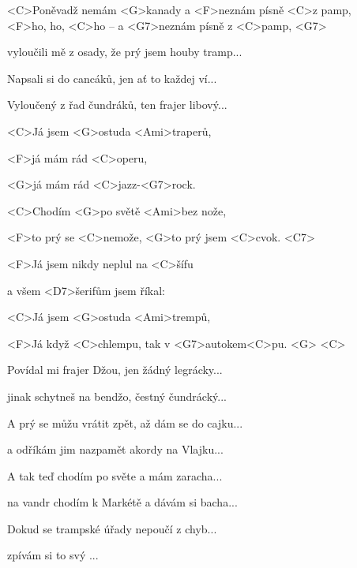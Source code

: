 

\zs
<C>Poněvadž nemám <G>kanady a <F>neznám písně <C>z pamp,
\\
<F>ho, ho, <C>ho -- a <G7>neznám písně z <C>pamp, 
<G7>

vyloučili mě z osady, že prý jsem houby tramp...

Napsali si do cancáků, jen ať to každej ví...

Vyloučený z řad čundráků, ten frajer libový...
\ks

\zr
<C>Já jsem <G>ostuda <Ami>traperů,

<F>já mám rád <C>operu,

<G>já mám rád <C>jazz-<G7>rock.

<C>Chodím <G>po světě <Ami>bez nože,

<F>to prý se <C>nemože, <G>to prý jsem <C>cvok. <C7>

<F>Já jsem nikdy neplul na <C>šífu

a všem <D7>šerifům jsem říkal: 

<C>Já jsem <G>ostuda <Ami>trempů,

<F>Já když <C>chlempu, tak v <G7>autokem<C>pu. <G> 
<C>
\kr

\zs
Povídal mi frajer Džou, jen žádný legrácky...

jinak schytneš na bendžo, čestný čundrácký...

A prý se můžu vrátit zpět, až dám se do cajku...

a odříkám jim nazpamět akordy na Vlajku...
\ks

\zr \kr

\zs
A tak teď chodím po světe a mám zaracha...

na vandr chodím k Markétě a dávám si bacha...

Dokud se trampské úřady nepoučí z chyb...

zpívám si to svý ...
\ks

\zr \kr

\kp
